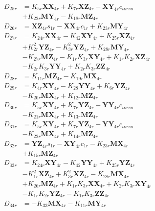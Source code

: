 \begin{multicols}{2}
\begin{align}
D_{25r} &= K_{5r}\mathbf{XX}_{4r} + K_{7r}\mathbf{XZ}_{4r} - \mathbf{XY}_{4r}c_{torso}  \nonumber \\
&+ K_{22r}\mathbf{MY}_{4r} - K_{18r}\mathbf{MZ}_{4r} \nonumber \\
D_{26r} &= \mathbf{XZ}_{4r}s_{1r} - \mathbf{XX}_{4r}c_{1r} + K_{23r}\mathbf{MY}_{4r} \nonumber \\
D_{27r} &= K_{24r}\mathbf{XX}_{4r} - K_{42}\mathbf{XY}_{4r} + K_{25r}\mathbf{XZ}_{4r}  \nonumber \\
&+ K_{2r}^2\mathbf{YZ}_{4r} - K_{3r}^2\mathbf{YZ}_{4r} + K_{28r}\mathbf{MY}_{4r}  \nonumber \\
&- K_{27r}\mathbf{MZ}_{4r} - K_{1r}K_{3r}\mathbf{XY}_{4r} + K_{1r}K_{2r}\mathbf{XZ}_{4r}  \nonumber \\
&- K_{2r}K_{3r}\mathbf{YY}_{4r} + K_{2r}K_{3r}\mathbf{ZZ}_{4r} \nonumber \\
D_{28r} &= K_{11r}\mathbf{MZ}_{4r} - K_{19r}\mathbf{MX}_{4r} \nonumber \\
D_{29r} &= K_{4r}\mathbf{XY}_{4r} - K_{28}\mathbf{YY}_{4r} + K_{6r}\mathbf{YZ}_{4r}  \nonumber \\
&- K_{20r}\mathbf{MX}_{4r} + K_{12r}\mathbf{MZ}_{4r} \nonumber \\
D_{30r} &= K_{5r}\mathbf{XY}_{4r} + K_{7r}\mathbf{YZ}_{4r} - \mathbf{YY}_{4r}c_{torso}  \nonumber \\
&- K_{21r}\mathbf{MX}_{4r} + K_{13r}\mathbf{MZ}_{4r} \nonumber \\
D_{31r} &= K_{5r}\mathbf{XY}_{4r} + K_{7r}\mathbf{YZ}_{4r} - \mathbf{YY}_{4r}c_{torso}  \nonumber \\
&- K_{22r}\mathbf{MX}_{4r} + K_{14r}\mathbf{MZ}_{4r} \nonumber \\
D_{32r} &= \mathbf{YZ}_{4r}s_{1r} - \mathbf{XY}_{4r}c_{1r} - K_{23r}\mathbf{MX}_{4r}  \nonumber \\
&+ K_{15r}\mathbf{MZ}_{4r} \nonumber \\
D_{33r} &= K_{24r}\mathbf{XY}_{4r} - K_{42}\mathbf{YY}_{4r} + K_{25r}\mathbf{YZ}_{4r}  \nonumber \\
&- K_{1r}^2\mathbf{XZ}_{4r} + K_{3r}^2\mathbf{XZ}_{4r} - K_{28r}\mathbf{MX}_{4r}  \nonumber \\
&+ K_{26r}\mathbf{MZ}_{4r} + K_{1r}K_{3r}\mathbf{XX}_{4r} + K_{2r}K_{3r}\mathbf{XY}_{4r}  \nonumber \\
&- K_{1r}K_{2r}\mathbf{YZ}_{4r} - K_{1r}K_{3r}\mathbf{ZZ}_{4r} \nonumber \\
D_{34r} &= - K_{33}\mathbf{MX}_{4r} - K_{11r}\mathbf{MY}_{4r} \nonumber \\

\end{align}
\end{multicols}
